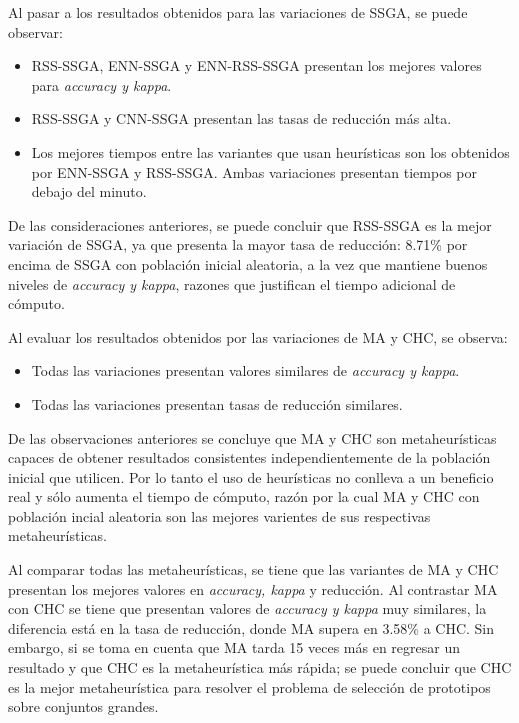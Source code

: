 Al pasar a los resultados obtenidos para las variaciones de SSGA, se puede observar:

\begin{itemize}

\item RSS-SSGA, ENN-SSGA y ENN-RSS-SSGA presentan los mejores valores para \emph{accuracy y kappa}.

\item RSS-SSGA y CNN-SSGA presentan las tasas de reducción más alta.

\item Los mejores tiempos entre las variantes que usan heurísticas son los obtenidos por ENN-SSGA y RSS-SSGA. Ambas variaciones presentan tiempos por debajo del minuto.

\end{itemize}

De las consideraciones anteriores, se puede concluir que RSS-SSGA es la mejor variación de SSGA, ya que presenta la mayor tasa de reducción: 8.71\% por encima de SSGA con población inicial aleatoria, a la vez que mantiene buenos niveles de \emph{accuracy y kappa}, razones que justifican el tiempo adicional de cómputo.

Al evaluar los resultados obtenidos por las variaciones de MA y CHC, se observa:

\begin{itemize}

\item Todas las variaciones presentan valores similares de \emph{accuracy y kappa}.

\item Todas las variaciones presentan tasas de reducción similares.

\end{itemize}

De las observaciones anteriores se concluye que MA y CHC son metaheurísticas capaces de obtener resultados consistentes independientemente de la población inicial que utilicen. Por lo tanto el uso de heurísticas no conlleva a un beneficio real y sólo aumenta el tiempo de cómputo, razón por la cual MA y CHC con población incial aleatoria son las mejores varientes de sus respectivas metaheurísticas.

Al comparar todas las metaheurísticas, se tiene que las variantes de MA y CHC presentan los mejores valores en \emph{accuracy, kappa} y reducción. Al contrastar MA con CHC se tiene que presentan valores de \emph{accuracy y kappa} muy similares, la diferencia está en la tasa de reducción, donde MA supera en 3.58\% a CHC. Sin embargo, si se toma en cuenta que MA tarda 15 veces más en regresar un resultado y que CHC es la metaheurística más rápida; se puede concluir que CHC es la mejor metaheurística para resolver el problema de selección de prototipos sobre conjuntos grandes.